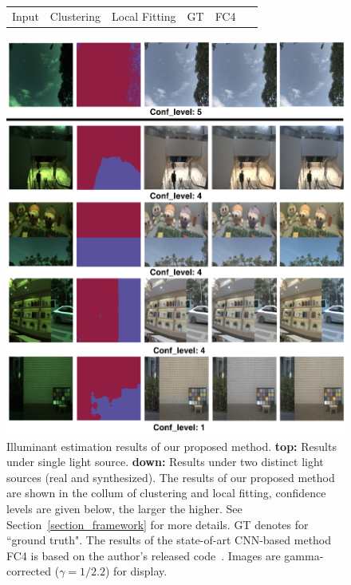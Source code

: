 \documentclass[10pt,twocolumn,letterpaper]{article}
\begin{document}
\begin{figure}[t]
\begin{center}
\footnotesize
\begin{tabular}{cccccc}
\hspace{0.3cm} Input & \hspace{0.15cm} Clustering & Local Fitting & \hspace{0.25cm} GT & \hspace{0.45cm} FC4~\cite{hu2017fc} \\
\end{tabular}
\includegraphics[width=\linewidth]{../Images/show_off.png}
\end{center}
   \caption{Illuminant estimation results of our proposed method.
            \textbf{top:} Results under single light source.
            \textbf{down:} Results under two distinct light sources (real and synthesized).
            The results of our proposed method are shown in the collum of clustering and local fitting,
            confidence levels are given below, the larger the higher.
            See Section~\ref{section_framework} for more details.
            GT denotes for ``ground truth".
            The results of the state-of-art CNN-based method FC4 is based on
            \setcounter{footnote}{0}
            the author's released code~\protect\footnotemark.
            Images are gamma-corrected ($\gamma = 1/2.2$) for display.}
\label{fig:show_off}
\end{figure}
\end{document}
